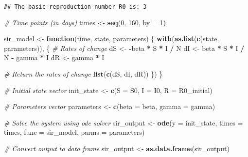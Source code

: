 \documentclass[
]{article}
\newenvironment{Shaded}{\begin{snugshade}}{\end{snugshade}}
\newcommand{\AttributeTok}[1]{\textcolor[rgb]{0.13,0.29,0.53}{#1}}
\newcommand{\CommentTok}[1]{\textcolor[rgb]{0.56,0.35,0.01}{\textit{#1}}}
\newcommand{\ControlFlowTok}[1]{\textcolor[rgb]{0.13,0.29,0.53}{\textbf{#1}}}
\newcommand{\DecValTok}[1]{\textcolor[rgb]{0.00,0.00,0.81}{#1}}
\newcommand{\FunctionTok}[1]{\textcolor[rgb]{0.13,0.29,0.53}{\textbf{#1}}}
\newcommand{\NormalTok}[1]{#1}
\newcommand{\OtherTok}[1]{\textcolor[rgb]{0.56,0.35,0.01}{#1}}
\newcommand{\SpecialCharTok}[1]{\textcolor[rgb]{0.81,0.36,0.00}{\textbf{#1}}}
\begin{document}
\begin{verbatim}
## The basic reproduction number R0 is: 3
\end{verbatim}

\begin{Shaded}
\begin{Highlighting}[]
\CommentTok{\# Time points (in days)}
\NormalTok{times }\OtherTok{\textless{}{-}} \FunctionTok{seq}\NormalTok{(}\DecValTok{0}\NormalTok{, }\DecValTok{160}\NormalTok{, }\AttributeTok{by =} \DecValTok{1}\NormalTok{)}
\end{Highlighting}
\end{Shaded}

\begin{Shaded}
\begin{Highlighting}[]
\NormalTok{sir\_model }\OtherTok{\textless{}{-}} \ControlFlowTok{function}\NormalTok{(time, state, parameters) \{}
  \FunctionTok{with}\NormalTok{(}\FunctionTok{as.list}\NormalTok{(}\FunctionTok{c}\NormalTok{(state, parameters)), \{}
    \CommentTok{\# Rates of change}
\NormalTok{    dS }\OtherTok{\textless{}{-}} \SpecialCharTok{{-}}\NormalTok{beta }\SpecialCharTok{*}\NormalTok{ S }\SpecialCharTok{*}\NormalTok{ I }\SpecialCharTok{/}\NormalTok{ N}
\NormalTok{    dI }\OtherTok{\textless{}{-}}\NormalTok{ beta }\SpecialCharTok{*}\NormalTok{ S }\SpecialCharTok{*}\NormalTok{ I }\SpecialCharTok{/}\NormalTok{ N }\SpecialCharTok{{-}}\NormalTok{ gamma }\SpecialCharTok{*}\NormalTok{ I}
\NormalTok{    dR }\OtherTok{\textless{}{-}}\NormalTok{ gamma }\SpecialCharTok{*}\NormalTok{ I}

    \CommentTok{\# Return the rates of change}
    \FunctionTok{list}\NormalTok{(}\FunctionTok{c}\NormalTok{(dS, dI, dR))}
\NormalTok{  \})}
\NormalTok{\}}

\CommentTok{\# Initial state vector}
\NormalTok{init\_state }\OtherTok{\textless{}{-}} \FunctionTok{c}\NormalTok{(}\AttributeTok{S =}\NormalTok{ S0, }\AttributeTok{I =}\NormalTok{ I0, }\AttributeTok{R =}\NormalTok{ R0\_initial)}

\CommentTok{\# Parameters vector}
\NormalTok{parameters }\OtherTok{\textless{}{-}} \FunctionTok{c}\NormalTok{(}\AttributeTok{beta =}\NormalTok{ beta, }\AttributeTok{gamma =}\NormalTok{ gamma)}


\CommentTok{\# Solve the system using ode solver}
\NormalTok{sir\_output }\OtherTok{\textless{}{-}} \FunctionTok{ode}\NormalTok{(}\AttributeTok{y =}\NormalTok{ init\_state, }\AttributeTok{times =}\NormalTok{ times, }\AttributeTok{func =}\NormalTok{ sir\_model, }\AttributeTok{parms =}\NormalTok{ parameters)}

\CommentTok{\# Convert output to data frame}
\NormalTok{sir\_output }\OtherTok{\textless{}{-}} \FunctionTok{as.data.frame}\NormalTok{(sir\_output)}
\end{Highlighting}
\end{Shaded}
\end{document}
